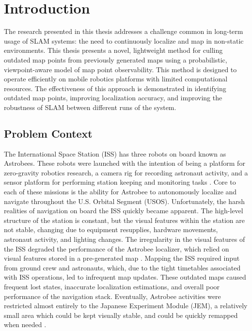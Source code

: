 \section{Introduction}

The research presented in this thesis addresses a challenge common in long-term usage of SLAM systems: the need to continuously localize and map in non-static environments. This thesis presents a novel, lightweight method for culling outdated map points from previously generated maps using a probabilistic, viewpoint-aware model of map point observability. This method is designed to operate efficiently on mobile robotics platforms with limited computational resources. The effectiveness of this approach is demonstrated in identifying outdated map points, improving localization accuracy, and improving the robustness of SLAM between different runs of the system.

\subsection{Problem Context}

The International Space Station (ISS) has three robots on board known as Astrobees. These robots were launched with the intention of being a platform for zero-gravity robotics research, a camera rig for recording astronaut activity, and a sensor platform for performing station keeping and monitoring tasks \cite{smithASTROBEENEWPLATFORM}. Core to each of these missions is the ability for Astrobee to autonomously localize and navigate throughout the U.S. Orbital Segment (USOS). Unfortunately, the harsh realities of navigation on board the ISS quickly became apparent. The high-level structure of the station is constant, but the visual features within the station are not stable, changing due to equipment resupplies, hardware movements, astronaut activity, and lighting changes. The irregularity in the visual features of the ISS degraded the performance of the Astrobee localizer, which relied on visual features stored in a pre-generated map \cite{soussanAstroLocEfficientRobust2022}. Mapping the ISS required input from ground crew and astronauts, which, due to the tight timetables associated with ISS operations, led to infrequent map updates. These outdated maps caused frequent lost states, inaccurate localization estimations, and overall poor performance of the navigation stack. Eventually, Astrobee activities were restricted almost entirely to the Japanese Experiment Module (JEM), a relatively small area which could be kept visually stable, and could be quickly remapped when needed \cite{carlinoLessonsLearnedAstrobee}.


